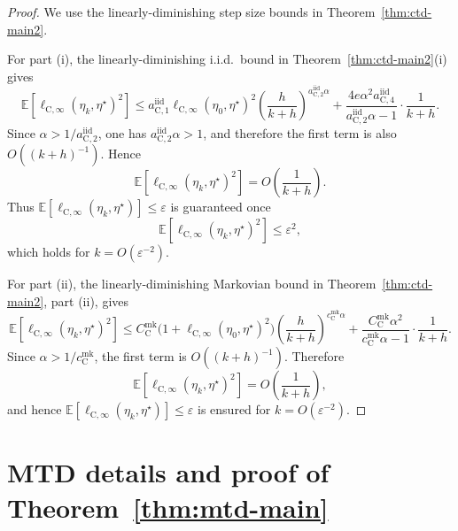 \documentclass{article}
\begin{document}
\begin{proof}
We use the linearly-diminishing step size bounds in Theorem~\ref{thm:ctd-main2}.

For part \textup{(i)}, the linearly-diminishing i.i.d.\ bound in Theorem~\ref{thm:ctd-main2}(i) gives
\begin{equation}
\mathbb E\left[\ell_{\mathrm C,\infty}(\eta_k,\eta^\star)^2\right] \le a_{\mathrm C,1}^{\mathrm{iid}}\ell_{\mathrm C,\infty}(\eta_0,\eta^\star)^2 \left(\frac{h}{k+h}\right)^{a_{\mathrm C,2}^{\mathrm{iid}}\alpha} + \frac{4e\alpha^2 a_{\mathrm C,4}^{\mathrm{iid}}}{a_{\mathrm C,2}^{\mathrm{iid}}\alpha-1}\cdot \frac{1}{k+h}.
\end{equation}
Since $\alpha>1/a_{\mathrm C,2}^{\mathrm{iid}}$, one has $a_{\mathrm C,2}^{\mathrm{iid}}\alpha>1$, and therefore the first term is also $O((k+h)^{-1})$. Hence
\begin{equation}
\mathbb E\left[\ell_{\mathrm C,\infty}(\eta_k,\eta^\star)^2\right] = O\left(\frac{1}{k+h}\right).
\end{equation}
Thus $\mathbb E[\ell_{\mathrm C,\infty}(\eta_k,\eta^\star)]\le \varepsilon$ is guaranteed once
\begin{equation}
\mathbb E\left[\ell_{\mathrm C,\infty}(\eta_k,\eta^\star)^2\right]\le \varepsilon^2,
\end{equation}
which holds for $k=O(\varepsilon^{-2})$.

For part \textup{(ii)}, the linearly-diminishing Markovian bound in Theorem~\ref{thm:ctd-main2}, part \textup{(ii)}, gives
\begin{equation}
\mathbb E\left[\ell_{\mathrm C,\infty}(\eta_k,\eta^\star)^2\right] \le C_{\mathrm C}^{\mathrm{mk}}\bigl(1+\ell_{\mathrm C,\infty}(\eta_0,\eta^\star)^2\bigr)\left(\frac{h}{k+h}\right)^{c_{\mathrm C}^{\mathrm{mk}}\alpha}+\frac{C_{\mathrm C}^{\mathrm{mk}}\alpha^2}{c_{\mathrm C}^{\mathrm{mk}}\alpha-1}\cdot\frac{1}{k+h}.
\end{equation}
Since $\alpha>1/c_{\mathrm C}^{\mathrm{mk}}$, the first term is $O((k+h)^{-1})$. Therefore
\begin{equation}
\mathbb E\left[\ell_{\mathrm C,\infty}(\eta_k,\eta^\star)^2\right]=O\left(\frac{1}{k+h}\right),
\end{equation}
and hence $\mathbb E[\ell_{\mathrm C,\infty}(\eta_k,\eta^\star)]\le\varepsilon$ is ensured for $k=O(\varepsilon^{-2})$.
\end{proof}

\section{MTD details and proof of Theorem~\ref{thm:mtd-main}}
\label{app:mtd}
\end{document}
